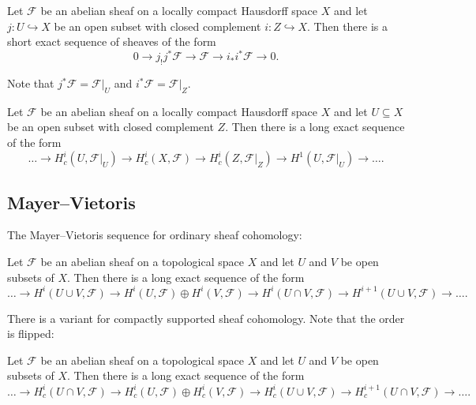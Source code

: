 \begin{lem}[name={Homework~3, Exercise~4(d)}]
Let \(\mathcal F\) be an abelian sheaf on a locally compact Hausdorff space \(X\) and let \(j\colon U\hookrightarrow X\) be an open subset with closed complement \(i\colon Z\hookrightarrow X\).
Then there is a short exact sequence of sheaves of the form
\[ 0 \to j_!j^*\mathcal F \to \mathcal F \to i_*i^*\mathcal F \to 0\text{.} \]
\end{lem}

Note that \(j^*\mathcal F=\mathcal F|_U\) and \(i^*\mathcal F=\mathcal F|_Z\).

\begin{cor}[name={open--closed sequence, \cref{lem:open-closed-sequence}}]
Let \(\mathcal F\) be an abelian sheaf on a locally compact Hausdorff space \(X\) and let \(U\subseteq X\) be an open subset with closed complement \(Z\).
Then there is a long exact sequence of the form
\[ \dots \to H^i_c(U,\mathcal F|_U) \to H^i_c(X,\mathcal F) \to H^i_c(Z,\mathcal F|_Z) \to H^1(U,\mathcal F|_U) \to \dots\text{.} \]
\end{cor}

\subsection{Mayer--Vietoris}
The Mayer--Vietoris sequence for ordinary sheaf cohomology:
\begin{prop}[name={Mayer--Vietoris sequence, Homework~7, Exercise~1(c)}]
Let \(\mathcal F\) be an abelian sheaf on a topological space \(X\) and let \(U\) and \(V\) be open subsets of \(X\).
Then there is a long exact sequence of the form
\[ \dots \to H^i(U\cup V,\mathcal F) \to H^i(U,\mathcal F)\oplus H^i(V,\mathcal F) \to H^i(U\cap V,\mathcal F) \to H^{i+1}(U\cup V,\mathcal F)\to\dots\text{.} \]
\end{prop}

There is a variant for compactly supported sheaf cohomology.
Note that the order is flipped:
\begin{prop}[name={compactly supported Mayer--Vietoris sequence, Additional exercise~13.2}]
Let \(\mathcal F\) be an abelian sheaf on a topological space \(X\) and let \(U\) and \(V\) be open subsets of \(X\).
Then there is a long exact sequence of the form
\[ \dots \to H^i_c(U\cap V,\mathcal F) \to H^i_c(U,\mathcal F)\oplus H^i_c(V,\mathcal F) \to H^i_c(U\cup V,\mathcal F) \to H^{i+1}_c(U\cap V,\mathcal F)\to\dots\text{.} \]
\end{prop}

